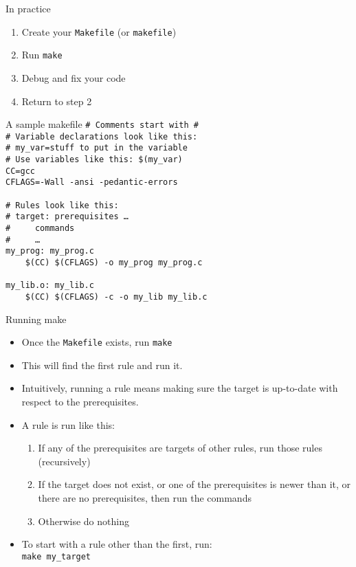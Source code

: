 \documentclass[handout]{beamer}
\begin{document}
\begin{frame}{In practice}
  \begin{enumerate}
    \item Create your \texttt{Makefile} (or \texttt{makefile})
    \item Run \texttt{make}
    \item Debug and fix your code
    \item Return to step 2
  \end{enumerate}
\end{frame}

\begin{frame}{A sample makefile}
\small
\texttt{\# Comments start with \# \\
\# Variable declarations look like this: \\
\# my\_var=stuff to put in the variable  \\
\# Use variables like this: \$(my\_var)  \\
CC=gcc \\
CFLAGS=-Wall -ansi -pedantic-errors \\
~\\
\# Rules look like this: \\
\# target: prerequisites \ldots \\
\# ~~~~commands \\ 
\# ~~~~\dots \\ 
my\_prog: my\_prog.c \\
~~~~\$(CC) \$(CFLAGS) -o my\_prog my\_prog.c \\
~\\
my\_lib.o: my\_lib.c \\
~~~~\$(CC) \$(CFLAGS) -c -o my\_lib my\_lib.c \\
}
\end{frame}

\begin{frame}{Running make}
  \begin{itemize}
    \item Once the \texttt{Makefile} exists, run \texttt{make}
    \item This will find the first rule and run it.
    \item Intuitively, running a rule means making sure the target is
      up-to-date with respect to the prerequisites.
    \item A rule is run like this:
      \begin{enumerate}
        \item If any of the prerequisites are targets of other rules, run
          those rules (recursively)
        \item If the target does not exist, or one of the prerequisites is
          newer than it, or there are no prerequisites, then run the commands
        \item Otherwise do nothing
      \end{enumerate}
    \item To start with a rule other than the first, run:\\
      \texttt{make my\_target}
  \end{itemize}
\end{frame}
\end{document}
